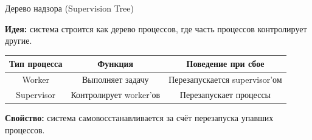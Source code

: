 \begin{frame}{Дерево надзора (Supervision Tree)}
	\begin{flushleft}
		\textbf{Идея:} система строится как дерево процессов, где часть процессов контролирует другие.
	\end{flushleft}
	\vspace{0.8em}
	\centering
	\begin{tabular}{|c|c|c|}
		\hline
		\textbf{Тип процесса} & \textbf{Функция} & \textbf{Поведение при сбое} \\
		\hline
		Worker & Выполняет задачу & Перезапускается supervisor’ом \\
		\hline
		Supervisor & Контролирует worker’ов & Перезапускает процессы \\
		\hline
	\end{tabular}
	\vspace{1em}
	\begin{flushleft}
		\textbf{Свойство:} система самовосстанавливается за счёт перезапуска упавших процессов.
	\end{flushleft}
\end{frame}